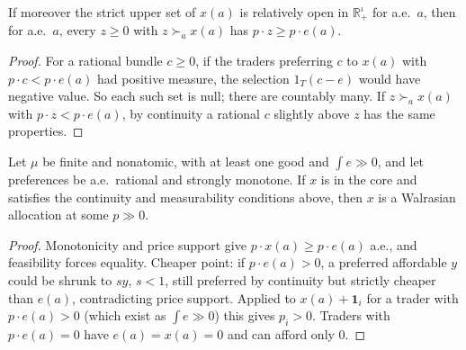 \begin{lemma}
\label{lem:aumann_support}
\leanok
{}
If moreover the strict upper set of $x(a)$ is relatively open in $\mathbb{R}^\iota_+$ for a.e.\ $a$, then for a.e.\ $a$,
every $z \ge 0$ with $z \succ_a x(a)$ has $p \cdot z \ge p \cdot e(a)$.
\end{lemma}
\begin{proof}
\leanok
For a rational bundle $c \ge 0$, if the traders preferring $c$ to $x(a)$ with $p \cdot c < p \cdot e(a)$ had positive
measure, the selection $1_T (c - e)$ would have negative value. So each such set is null; there are countably many. If
$z \succ_a x(a)$ with $p \cdot z < p \cdot e(a)$, by continuity a rational $c$ slightly above $z$ has the same properties.
\end{proof}

\begin{theorem}
\label{thm:aumann_core}
\leanok
{}
Let $\mu$ be finite and nonatomic, with at least one good and $\int e \gg 0$, and let preferences be a.e.\ rational and
strongly monotone. If $x$ is in the core and satisfies the continuity and measurability conditions above, then $x$ is a
Walrasian allocation at some $p \gg 0$.
\end{theorem}
\begin{proof}
\leanok
Monotonicity and price support give $p \cdot x(a) \ge p \cdot e(a)$ a.e., and feasibility forces equality. Cheaper point: if
$p \cdot e(a) > 0$, a preferred affordable $y$ could be shrunk to $sy$, $s < 1$, still preferred by continuity but strictly
cheaper than $e(a)$, contradicting price support. Applied to $x(a) + \mathbf{1}_i$ for a trader with $p \cdot e(a) > 0$
(which exist as $\int e \gg 0$) this gives $p_i > 0$. Traders with $p \cdot e(a) = 0$ have $e(a) = x(a) = 0$ and can afford
only $0$.
\end{proof}

